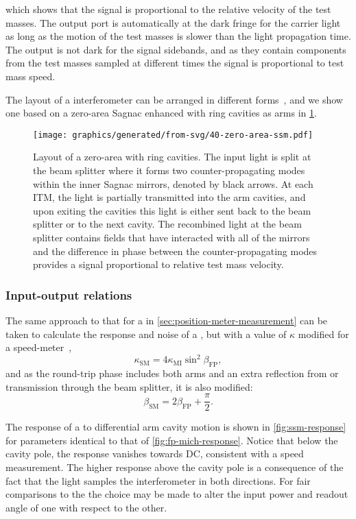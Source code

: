 which shows that the signal is proportional to the relative velocity of the test masses. The output port is automatically at the dark fringe for the carrier light as long as the motion of the test masses is slower than the light propagation time. The output is not dark for the signal sidebands, and as they contain components from the test masses sampled at different times the signal is proportional to test mass speed.

The layout of a \SSM{} interferometer can be arranged in different forms~\cite{Huttner2016}, and we show one based on a zero-area Sagnac enhanced with ring cavities as arms in \cref{fig:zero-area-ssm}.

\begin{figure}
  \centering
  \texttt{[image: graphics/generated/from-svg/40-zero-area-ssm.pdf]}
  \caption[Layout of a zero-area \SSM{}]{\label{fig:zero-area-ssm}Layout of a zero-area \SSM{} with ring cavities. The input light is split at the beam splitter where it forms two counter-propagating modes within the inner Sagnac mirrors, denoted by black arrows. At each \gls{ITM}, the light is partially transmitted into the arm cavities, and upon exiting the cavities this light is either sent back to the beam splitter or to the next cavity. The recombined light at the beam splitter contains fields that have interacted with all of the mirrors and the difference in phase between the counter-propagating modes provides a signal proportional to relative test mass velocity.}
\end{figure} 

\subsubsection{Input-output relations}
The same approach to that for a \FPMI{} in \cref{sec:position-meter-measurement} can be taken to calculate the response and noise of a \SM{}, but with a value of $\kappa$ modified for a speed-meter~\cite{Chen2003},
\begin{equation}
  \kappa_{\text{SM}} = 4 \kappa_{\text{MI}} \sin^2 \beta_{\text{FP}},
\end{equation}
and as the round-trip phase includes both arms and an extra reflection from or transmission through the beam splitter, it is also modified:
\begin{equation}
  \beta_{\text{SM}} = 2 \beta_{\text{FP}} + \frac{\pi}{2}.
\end{equation}

The response of a \SSM{} to differential arm cavity motion is shown in \cref{fig:ssm-response} for parameters identical to that of \cref{fig:fp-mich-response}. Notice that below the cavity pole, the response vanishes towards \gls{DC}, consistent with a speed measurement. The higher response above the cavity pole is a consequence of the fact that the light samples the interferometer in both directions. For fair comparisons to the \MI{} the choice may be made to alter the input power and readout angle of one with respect to the other.

